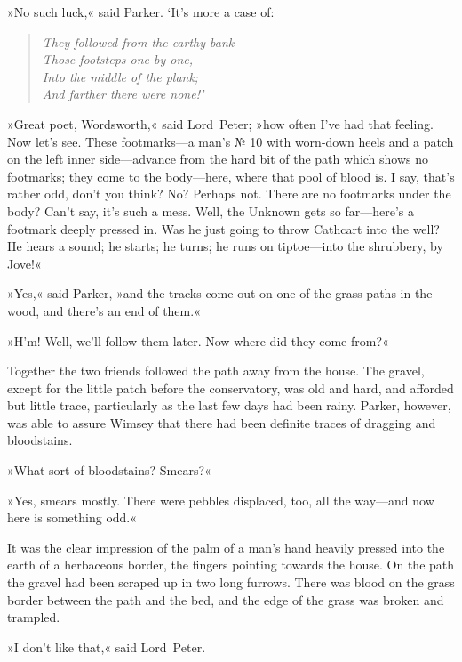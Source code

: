 »No such luck,« said Parker. `It's more a case of:
\vspace{-1ex}
\begin{quote}\itshape
They followed from the earthy bank\\
Those footsteps one by one,\\
Into the middle of the plank;\\
And farther there were none!'\end{quote}

»Great poet, Wordsworth,« said Lord~Peter; »how often I've had that feeling. Now let's see. These footmarks—a man's № 10 with worn-down heels and a patch on the left inner side—advance from the hard bit of the path which shows no footmarks; they come to the body—here, where that pool of blood is. I say, that's rather odd, don't you think? No? Perhaps not. There are no footmarks under the body? Can't say, it's such a mess. Well, the Unknown gets so far—here's a footmark deeply pressed in. Was he just going to throw Cathcart into the well? He hears a sound; he starts; he turns; he runs on tiptoe—into the shrubbery, by Jove!«

»Yes,« said Parker, »and the tracks come out on one of the grass paths in the wood, and there's an end of them.«

»H'm! Well, we'll follow them later. Now where did they come from?«

Together the two friends followed the path away from the house. The gravel, except for the little patch before the conservatory, was old and hard, and afforded but little trace, particularly as the last few days had been rainy. Parker, however, was able to assure Wimsey that there had been definite traces of dragging and bloodstains.

»What sort of bloodstains? Smears?«

»Yes, smears mostly. There were pebbles displaced, too, all the way—and now here is something odd.«

It was the clear impression of the palm of a man's hand heavily pressed into the earth of a herbaceous border, the fingers pointing towards the house. On the path the gravel had been scraped up in two long furrows. There was blood on the grass border between the path and the bed, and the edge of the grass was broken and trampled.

»I don't like that,« said Lord~Peter.

